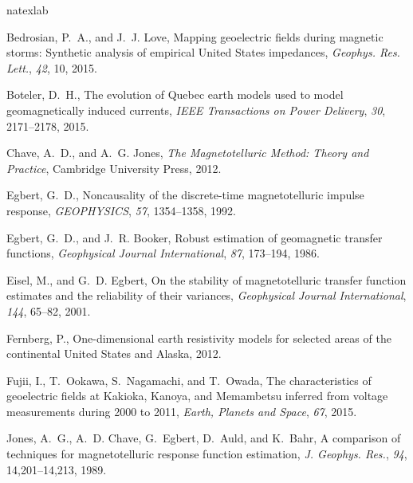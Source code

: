 \documentclass[linenumbers,draft]{agujournal}
\begin{document}
\begin{thebibliography}{27}
\expandafter\ifx\csname natexlab\endcsname\relax\def\natexlab#1{#1}\fi

{Bedrosian}, P.~A., and J.~J. {Love}, {Mapping geoelectric fields during
  magnetic storms: Synthetic analysis of empirical United States impedances},
  {\it Geophys. Res. Lett.\/}, {\it 42\/}, 10, 2015.

Boteler, D.~H., The evolution of {Q}uebec earth models used to model
  geomagnetically induced currents, {\it {IEEE} Transactions on Power
  Delivery\/}, {\it 30\/}, 2171--2178, 2015.

Chave, A.~D., and A.~G. Jones, {\it The Magnetotelluric Method: Theory and
  Practice\/}, Cambridge University Press, 2012.

Egbert, G.~D., Noncausality of the discrete-time magnetotelluric impulse
  response, {\it {GEOPHYSICS}\/}, {\it 57\/}, 1354--1358, 1992.

Egbert, G.~D., and J.~R. Booker, Robust estimation of geomagnetic transfer
  functions, {\it Geophysical Journal International\/}, {\it 87\/}, 173--194,
  1986.

Eisel, M., and G.~D. Egbert, On the stability of magnetotelluric transfer
  function estimates and the reliability of their variances, {\it Geophysical
  Journal International\/}, {\it 144\/}, 65--82, 2001.

Fernberg, P., One-dimensional earth resistivity models for selected areas of
  the continental {U}nited {S}tates and {A}laska, 2012.

Fujii, I., T.~Ookawa, S.~Nagamachi, and T.~Owada, The characteristics of
  geoelectric fields at {K}akioka, {K}anoya, and {M}emambetsu inferred from
  voltage measurements during 2000 to 2011, {\it Earth, Planets and Space\/},
  {\it 67\/}, 2015.

Jones, A.~G., A.~D. Chave, G.~Egbert, D.~Auld, and K.~Bahr, A comparison of
  techniques for magnetotelluric response function estimation, {\it J. Geophys.
  Res.\/}, {\it 94\/}, 14,201--14,213, 1989.


\end{thebibliography}
\end{document}
